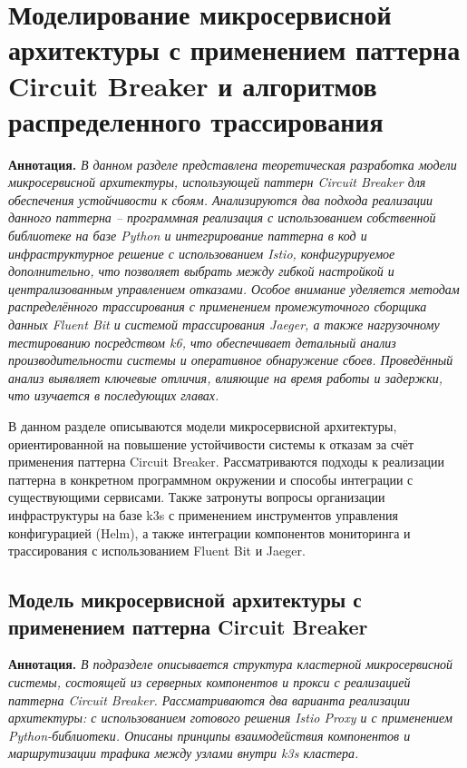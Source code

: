 \chapter{Моделирование микросервисной архитектуры с применением паттерна Circuit Breaker и алгоритмов распределенного трассирования}

\textbf{Аннотация.} \textit{ В данном разделе представлена теоретическая разработка модели микросервисной архитектуры, использующей паттерн Circuit Breaker для обеспечения устойчивости к сбоям.  Анализируются два подхода реализации данного паттерна – программная реализация с использованием собственной библиотеке на базе Python и интегрирование паттерна в код и инфраструктурное решение с использованием Istio, конфигурируемое дополнительно, что позволяет выбрать между гибкой настройкой и централизованным управлением отказами. Особое внимание уделяется методам распределённого трассирования с применением промежуточного сборщика данных Fluent Bit и системой трассирования Jaeger, а также нагрузочному тестированию посредством k6, что обеспечивает детальный анализ производительности системы и оперативное обнаружение сбоев. Проведённый анализ выявляет ключевые отличия, влияющие на время работы и задержки, что изучается в последующих главах.}

В данном разделе описываются модели микросервисной архитектуры, ориентированной на повышение устойчивости системы к отказам за счёт применения паттерна Circuit Breaker. Рассматриваются подходы к реализации паттерна в конкретном программном окружении и способы интеграции с существующими сервисами. Также затронуты вопросы организации инфраструктуры на базе k3s с применением инструментов управления конфигурацией (Helm), а также интеграции компонентов мониторинга и трассирования с использованием Fluent Bit и Jaeger. 

  
\section{Модель микросервисной архитектуры с применением паттерна Circuit Breaker}
  
\textbf{Аннотация.} \textit{В подразделе описывается структура кластерной микросервисной системы, состоящей из серверных компонентов и прокси с реализацией паттерна Circuit Breaker. Рассматриваются два варианта реализации архитектуры: с использованием готового решения Istio Proxy и с применением Python-библиотеки. Описаны принципы взаимодействия компонентов и маршрутизации трафика между узлами внутри k3s кластера.}

